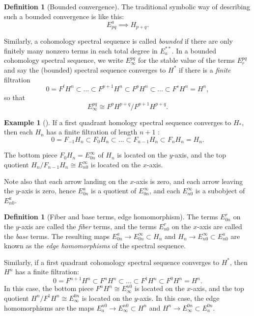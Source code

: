 \documentclass[reqno]{amsart}
\theoremstyle{definition}
\newtheorem{definition}[theorem]{Definition}
\newtheorem{example}[theorem]{Example}
\theoremstyle{remark}
\begin{document}
\begin{definition}[Bounded convergence]
    The traditional symbolic way of describing such a bounded
    convergence is like this:
    \[
    E_{pq}^{a} \implies H_{p+q}.
    \] 

    Similarly, a cohomology spectral sequence is
    called \textit{bounded} if there are
    only finitely many nonzero terms in each total 
    degree in $E_a^{* *}$. In a bounded cohomology
    spectral sequence, we write
    $E_{\infty}^{p q}$ for the stable value of the
    terms $E_{r}^{pq}$ and say the (bounded) spectral
    sequence converges to $H^{*}$ if there is a
    \textit{finite} filtration
    \[
    0 = F^{t} H^{n} \subset \ldots \subset 
    F^{p+1} H^{n} \subset F^{p} H^{n} \subset \ldots
    \subset  F^{s} H^{n} = H^{n},
    \] 
    so that
    \[
    E_{\infty}^{pq} \cong F^{p} H^{p+q} / F^{p+1} H^{p+q}.
    \] 
\end{definition}

    \begin{example}[]
        If a first quadrant homology spectral sequence converges
        to $H_*$, then each $H_n$ has a finite filtration of length
        $n+1$ :
        \[
        0 = F_{-1} H_n \subset F_0 H_n \subset 
        \ldots \subset F_{n-1} H_n \subset 
        F_n H_n = H_n.
        \] 

        The bottom piece
        $F_0 H_n = E_{0n}^{\infty}$ of $H_n$ is located
        on the $y$-axis, and the top quotient
        $H_n / F_{n-1} H_n \cong E_{n 0}^{\infty}$ is located
        on the $x$-axis.

        Note also that each arrow landing on the
        $x$-axis is zero, and each arrow leaving the
        $y$-axis is zero, hence
        $E_{0n}^{a}$ is a quotient of
        $E_{0 n}^{\infty}$, and each
        $E_{n 0}^{\infty}$ is a subobject of
        $E_{n 0}^{a}$.

        \begin{definition}[Fiber and base terms, edge homomorphism]
            The terms $E_{0n}^{r}$ on the $y$-axis are
            called the \textit{fiber} terms, and the
            terms $E_{n 0}^{r}$ on the $x$-axis are called the
            \textit{base} terms. The
            resulting maps $E_{0 n}^{a} \to 
            E_{0n}^{\infty} \subset H_n$ and
            $H_n \to E_{n 0}^{\infty} \subset 
            E_{n 0}^{a}$ are known as the \textit{edge homomorphisms}
            of the spectral sequence.
        \end{definition}


        Similarly, if a first quadrant cohomology spectral
        sequence converges to $H^{*}$, then
        $H^{n}$ has a finite filtration:
        \[
        0 = F^{n+1} H^{n} \subset F^{n} H^{n} \subset 
        \ldots \subset 
        F^{1} H^{n} \subset F^{0} H^{n} = H^{n}.
        \] 
        In this case, the bottom piece $F^{n} H^{n} \cong
        E_{\infty}^{n 0}$ is located on the $x$-axis, and the
        top quotient $H^{n} / F^{1} H^{n} \cong
        E_{\infty}^{0 n}$ is located on the $y$-axis.
        In this case, the edge homomorphisms are the
        maps $E_a^{n 0} \to E_{\infty}^{n 0} \subset H^{n}$ 
        and $H^{n} \to E_{\infty}^{0n} \subset E_a^{0n}$.
    \end{example}
\end{document}
